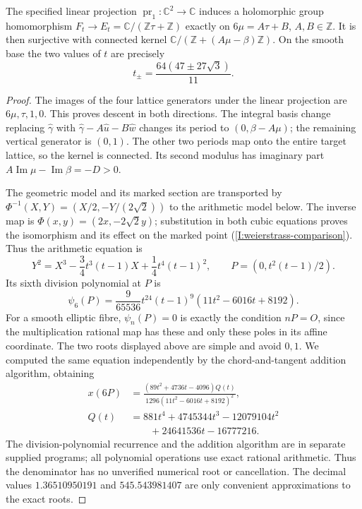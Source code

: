 \begin{proposition}\label{fam:src:D.1.1}\label{fam:st:D.1.1}
The specified linear projection \(\operatorname{pr}_1:\mathbb C^2\to
\mathbb C\) induces a holomorphic group homomorphism
\(F_t\to E_t=\mathbb C/(\mathbb Z\tau+\mathbb Z)\) exactly on
\(6\mu=A\tau+B\), \(A,B\in\mathbb Z\). It is then surjective with
connected kernel
\(\mathbb C/(\mathbb Z+(A\mu-\beta)\mathbb Z)\).
On the smooth base the two values of \(t\) are precisely
\[
 t_\pm=\frac{64(47\pm27\sqrt3)}{11}.
\]
\end{proposition}

\begin{proof}
The images of the four lattice generators under the linear projection
are \(6\mu,\tau,1,0\). This proves descent in both directions.
The integral basis change replacing \(\widehat\gamma\) with
\(\widehat\gamma-A\widehat u-B\widehat w\) changes its period to
\((0,\beta-A\mu)\); the remaining vertical generator is \((0,1)\).
The other two periods map onto the entire target lattice, so the kernel
is connected. Its second modulus has imaginary part
\(A\operatorname{Im}\mu-\operatorname{Im}\beta=-D>0\).

The geometric model and its marked section are transported by
$\Phi^{-1}(X,Y)=(X/2,-Y/(2\sqrt2))$ to the arithmetic model
below. The inverse map is
$\Phi(x,y)=(2x,-2\sqrt2y)$; substitution in both cubic
equations proves the isomorphism and its effect on the marked point
(\cref{I:weierstrass-comparison}). Thus the arithmetic equation is
\[
 Y^2=X^3-\frac34t^3(t-1)X+\frac14t^4(t-1)^2,
 \qquad P=(0,t^2(t-1)/2).
\]
Its sixth division polynomial at \(P\) is
\[
 \psi_6(P)=\frac9{65536}t^{24}(t-1)^9
 (11t^2-6016t+8192).
\]
For a smooth elliptic fibre, \(\psi_n(P)=0\) is exactly the condition
\(nP=O\), since the multiplication rational map has these and only these
poles in its affine coordinate. The two roots displayed above are simple
and avoid \(0,1\). We computed the same equation independently by the
chord-and-tangent addition algorithm, obtaining
\[
 \begin{aligned}
 x(6P)&=\frac{(89t^2+4736t-4096)Q(t)}
 {1296(11t^2-6016t+8192)^2},\\
 Q(t)&=881t^4+4745344t^3-12079104t^2\\
 &\hspace{2em}+24641536t-16777216.
 \end{aligned}
\]
The division-polynomial recurrence and the addition algorithm are in
separate supplied programs; all polynomial operations use exact rational
arithmetic. Thus the denominator has no unverified numerical root or
cancellation. The decimal values \(1.36510950191\) and
\(545.543981407\) are only convenient approximations to the exact roots.
\end{proof}